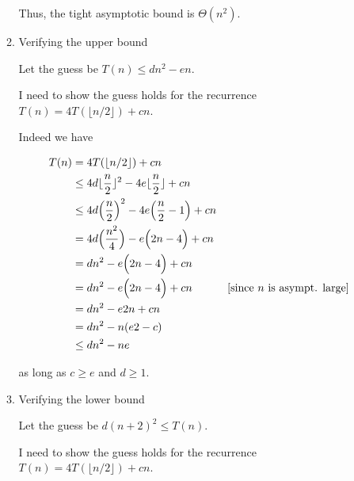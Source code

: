 \documentclass[12pt]{article}
\begin{document}
\begin{enumerate}[1.]
\begin{enumerate}[1.]
\begin{mdframed}
        \bigskip

        Thus, the tight asymptotic bound is $\Theta(n^2)$.

        \end{mdframed}

        \item Verifying the upper bound

        \begin{mdframed}

        Let the guess be $T(n) \leq dn^2 - en$.

        \bigskip

        I need to show the guess holds for the recurrence $T(n) = 4T(\lfloor n/2 \rfloor) + cn$.

        \bigskip

        Indeed we have

        \begin{align}
            T(n) &= 4T(\lfloor n/2 \rfloor) + cn\\
            &\leq 4d\lfloor \frac{n}{2} \rfloor^2 - 4e\lfloor \frac{n}{2} \rfloor + cn\\
            &\leq 4d\Bigl(\frac{n}{2} \Bigr)^2 - 4e\Bigl( \frac{n}{2} - 1 \Bigr) + cn\\
            &= 4d\Bigl(\frac{n^2}{4} \Bigr) - e\Bigl( 2n - 4 \Bigr) + cn\\
            &= dn^2 - e\Bigl( 2n - 4 \Bigr) + cn\\
            &= dn^2 - e\Bigl( 2n - 4 \Bigr) + cn & [\text{since $n$ is asympt. large}]\\
            &= dn^2 - e2n + cn\\
            &= dn^2 - n(e2 - c)\\
            &\leq dn^2 - ne
        \end{align}

        \bigskip

        as long as $c \geq e$ and $d \geq 1$.

        \end{mdframed}

        \item Verifying the lower bound

        \bigskip

        \begin{mdframed}

        Let the guess be $d(n+2)^2 \leq T(n)$.

        \bigskip

        I need to show the guess holds for the recurrence $T(n) = 4T(\lfloor n/2 \rfloor) + cn$.


\end{mdframed}
\end{enumerate}
\end{enumerate}
\end{document}
